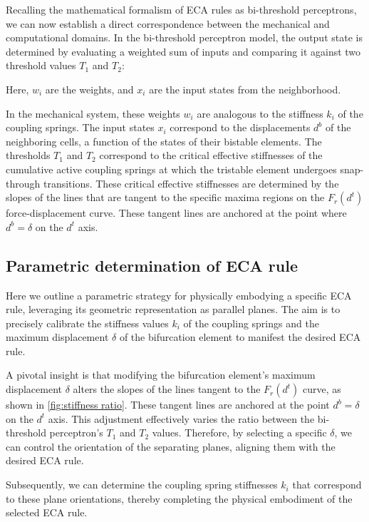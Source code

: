 Recalling the mathematical formalism of ECA rules as bi-threshold perceptrons, we can now establish a direct correspondence between the mechanical and computational domains. In the bi-threshold perceptron model, the output state is determined by evaluating a weighted sum of inputs and comparing it against two threshold values \( T_1 \) and \( T_2 \):


Here, \( w_i \) are the weights, and \( x_i \) are the input states from the neighborhood.

In the mechanical system, these weights \( w_i \) are analogous to the stiffness \( k_i \) of the coupling springs. The input states \( x_i \) correspond to the displacements \( d^b \) of the neighboring cells, a function of the states of their bistable elements. 
The thresholds \( T_1 \) and \( T_2 \) correspond to the critical effective stiffnesses of the cumulative active coupling springs at which the tristable element undergoes snap-through transitions. These critical effective stiffnesses are determined by the slopes of the lines that are tangent to the specific maxima regions on the \( F_r(d^t) \) force-displacement curve. These tangent lines are anchored at the point where \( d^b = \delta \) on the \( d^t \) axis.

\subsection*{Parametric determination of ECA rule}
Here we outline a parametric strategy for physically embodying a specific ECA rule, leveraging its geometric representation as parallel planes. The aim is to precisely calibrate the stiffness values \( k_i \) of the coupling springs and the maximum displacement \( \delta \) of the bifurcation element to manifest the desired ECA rule.

A pivotal insight is that modifying the bifurcation element's maximum displacement \( \delta \) alters the slopes of the lines tangent to the \( F_r(d^t) \) curve, as shown in \autoref*{fig:stiffness ratio}. These tangent lines are anchored at the point \( d^b = \delta \) on the \( d^t \) axis. This adjustment effectively varies the ratio between the bi-threshold perceptron's \( T_1 \) and \( T_2 \) values. Therefore, by selecting a specific \( \delta \), we can control the orientation of the separating planes, aligning them with the desired ECA rule.

Subsequently, we can determine the coupling spring stiffnesses \( k_i \) that correspond to these plane orientations, thereby completing the physical embodiment of the selected ECA rule.



